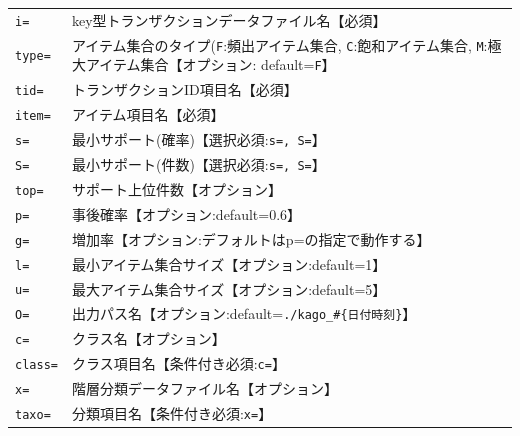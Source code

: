 \documentclass[a4paper]{jarticle}
\begin{document}
\begin{table}[htbp]
{\small
\begin{tabular}{ll}
\verb|i=|    & key型トランザクションデータファイル名【必須】 \\
\verb|type=| & アイテム集合のタイプ(\verb|F|:頻出アイテム集合, \verb|C|:飽和アイテム集合, \verb|M|:極大アイテム集合【オプション: default=\verb|F|】\\
\verb|tid=|  & トランザクションID項目名【必須】\\
\verb|item=| & アイテム項目名【必須】 \\
\verb|s=|    & 最小サポート(確率)【選択必須:\verb|s=, S=|】\\
\verb|S=|    & 最小サポート(件数)【選択必須:\verb|s=, S=|】\\
\verb|top=|  & サポート上位件数【オプション】\\
\verb|p=|    & 事後確率【オプション:default=0.6】\\
\verb|g=|    & 増加率【オプション:デフォルトはp=の指定で動作する】\\
\verb|l=|    & 最小アイテム集合サイズ【オプション:default=1】\\
\verb|u=|    & 最大アイテム集合サイズ【オプション:default=5】\\
\verb|O=|    & 出力パス名【オプション:default=\verb|./kago_#{日付時刻}|】\\
\verb|c=|    & クラス名【オプション】 \\
\verb|class=|& クラス項目名【条件付き必須:\verb|c=|】 \\
\verb|x=|    & 階層分類データファイル名【オプション】\\
\verb|taxo=| & 分類項目名【条件付き必須:\verb|x=|】\\

\end{tabular} 
}
\end{table} 
\end{document}
